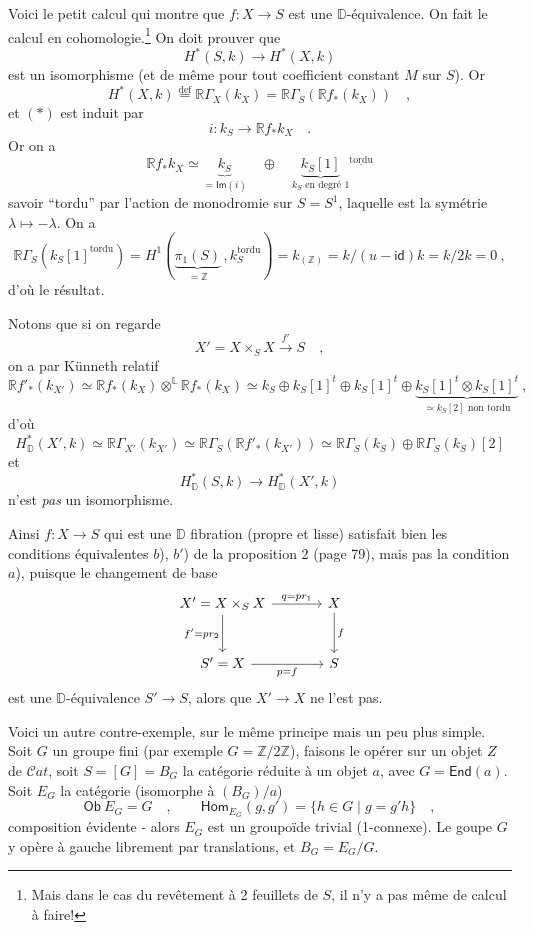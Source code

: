 \documentclass[11pt,leqno]{article}
\newcommand{\printedpage}[1]{\marginpar{\footnotesize p.~#1}}
\newcommand{\msp}[1]{\marginpar{\footnotesize [#1]}}
\newcommand{\D}{\mathbb{D}}
\newcommand{\Cat}{\mathcal{C}at}
\newcommand{\RR}{\mathbb{R}}
\begin{document}
\msp{page 89}
Voici le petit calcul qui montre que $f : X \to S$ est une $\D$-équivalence. On fait le calcul en cohomologie.\footnote[46]{Mais dans le cas du revêtement à 2 feuillets de $S$, il n'y a pas même de calcul à faire!} On doit prouver que
\[ H^*(S,k) \longrightarrow H^*(X,k) \tag*{$(*)$} \]
\printedpage{55}
est un isomorphisme (et de même pour tout coefficient constant $M$ sur $S$). Or
\[ H^*(X,k) \overset{\mathrm{def}}{=} \RR\Gamma_X(k_X) = \RR\Gamma_S(\RR f_*(k_X)) \quad , \]
et $(*)$ est induit par
\[ i : k_S \longrightarrow \RR f_* k_X \quad . \]
Or on a
\[ \RR f_* k_X \simeq \underbrace{k_S}_{= \mathsf{Im}(i)} \quad \oplus \quad \underbrace{k_S[1]}_{k_S \text{ en degré } 1}{}^{\underline{\mathrm{tordu}}} \]
savoir ``tordu'' par l'action de monodromie sur $S = S^1$, laquelle est la symétrie $\lambda \mapsto -\lambda$. On a
\[ \RR\Gamma_S(k_S[1]^{\mathrm{tordu}}) = H^1(\underbrace{\pi_1(S)}_{= \mathbb{Z}}\, , k_S^{\mathrm{tordu}}) = k_{(\mathbb{Z})} = k/(u - \mathsf{id})k = k/2k = 0 \ , \]
d'où le résultat.

Notons que si on regarde
\[ X' = X \times_S X \xrightarrow{f'} S \quad , \]
on a par Künneth relatif
\[ \RR f'_*(k_{X'}) \simeq \RR f_*(k_X) \otimes^{\mathbb{L}} \RR f_*(k_X) \simeq k_S \oplus k_S[1]^t \oplus k_S[1]^t \oplus \underbrace{k_S[1]^t \otimes k_S[1]^t}_{\simeq k_S[2] \text{ non tordu}} \ , \]
d'où
\[ H^*_{\D}(X',k) \simeq \RR\Gamma_{X'}(k_{X'}) \simeq \RR\Gamma_S(\RR f'_*(k_{X'})) \simeq \RR\Gamma_S(k_S) \oplus \RR\Gamma_S(k_S)[2] \]
et
\[ H^*_{\D}(S,k) \longrightarrow H^*_{\D}(X',k) \]
n'est \textit{pas} un isomorphisme.

\msp{page 90}
Ainsi $f : X \to S$ qui est une $\D$ fibration (propre et lisse) satisfait bien les conditions équivalentes $b$), $b'$) de la proposition 2 (page 79), mais pas la condition $a$), puisque le changement de base
\[
\begin{tikzcd}[column sep=large, row sep=large]
X' = X \times_S X \arrow[r, "{q = pr_1}"] \arrow[d, "{f' = pr_2}"'] & X \arrow[d, "f"] \\
S' = X \arrow[r, "{p = f}"'] & S
\end{tikzcd}
\]
est une $\D$-équivalence $S' \to S$, alors que $X' \to X$ ne l'est pas.

Voici un autre contre-exemple, sur le même principe mais un peu plus simple. Soit $G$ un groupe fini (par exemple $G = \mathbb{Z}/2\mathbb{Z}$), faisons le opérer sur un objet $Z$ de $\Cat$, soit $S = [G] = B_G$ la catégorie réduite à un objet $a$, avec $G = \mathsf{End}(a)$. Soit $E_G$ la catégorie (isomorphe à $(B_G)/a$)
\[ \mathsf{Ob}\ E_G = G \quad , \qquad \mathsf{Hom}_{E_G}(g,g') = \{ h \in G \mid g = g'h \} \quad , \]
composition évidente - alors $E_G$ est un groupoïde trivial (1-connexe). Le goupe $G$ y opère à gauche librement par translations, et $B_G = E_G/G$. %
\end{document}
